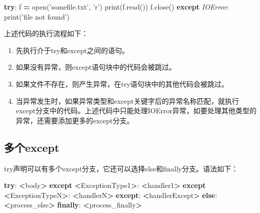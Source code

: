 \documentclass[]{ctexbook}
\newenvironment{Shaded}{\begin{snugshade}}{\end{snugshade}}
\newcommand{\BuiltInTok}[1]{#1}
\newcommand{\ControlFlowTok}[1]{\textcolor[rgb]{0.13,0.29,0.53}{\textbf{#1}}}
\newcommand{\NormalTok}[1]{#1}
\newcommand{\OperatorTok}[1]{\textcolor[rgb]{0.81,0.36,0.00}{\textbf{#1}}}
\newcommand{\PreprocessorTok}[1]{\textcolor[rgb]{0.56,0.35,0.01}{\textit{#1}}}
\newcommand{\StringTok}[1]{\textcolor[rgb]{0.31,0.60,0.02}{#1}}
\providecommand{\tightlist}{%
  \setlength{\itemsep}{0pt}\setlength{\parskip}{0pt}}
\begin{document}
\begin{Shaded}
\begin{Highlighting}[]
\ControlFlowTok{try}\NormalTok{:}
\NormalTok{    f }\OperatorTok{=} \BuiltInTok{open}\NormalTok{(}\StringTok{'somefile.txt'}\NormalTok{, }\StringTok{'r'}\NormalTok{)}
    \BuiltInTok{print}\NormalTok{(f.read())}
\NormalTok{    f.close()}
\ControlFlowTok{except} \PreprocessorTok{IOError}\NormalTok{:}
    \BuiltInTok{print}\NormalTok{(}\StringTok{'file not found'}\NormalTok{)}
\end{Highlighting}
\end{Shaded}

上述代码的执行流程如下：

\begin{enumerate}
\def\labelenumi{\arabic{enumi}.}
\setcounter{enumi}{26}
\tightlist
\item
  先执行介于try和except之间的语句。
\item
  如果没有异常，则except语句块中的代码会被跳过。
\item
  如果文件不存在，则产生异常，在try语句块中的其他代码会被跳过。
\item
  当异常发生时，如果异常类型和except关键字后的异常名称匹配，就执行except分支中的代码。上述代码中只能处理IOError异常，如要处理其他类型的异常，还需要添加更多的except分支。
\end{enumerate}

\hypertarget{ux591aux4e2aexcept}{%
\subsection{多个except}\label{ux591aux4e2aexcept}}

try声明可以有多个except分支，它还可以选择else和finally分支。语法如下：

\begin{Shaded}
\begin{Highlighting}[]
\ControlFlowTok{try}\NormalTok{:}
    \OperatorTok{<}\NormalTok{body}\OperatorTok{>}
\ControlFlowTok{except} \OperatorTok{<}\NormalTok{ExceptionType1}\OperatorTok{>}\NormalTok{:}
    \OperatorTok{<}\NormalTok{handler1}\OperatorTok{>}
\ControlFlowTok{except} \OperatorTok{<}\NormalTok{ExceptionTypeN}\OperatorTok{>}\NormalTok{:}
    \OperatorTok{<}\NormalTok{handlerN}\OperatorTok{>}
\ControlFlowTok{except}\NormalTok{:}
    \OperatorTok{<}\NormalTok{handlerExcept}\OperatorTok{>}
\ControlFlowTok{else}\NormalTok{:}
    \OperatorTok{<}\NormalTok{process_else}\OperatorTok{>}
\ControlFlowTok{finally}\NormalTok{:}
    \OperatorTok{<}\NormalTok{process_finally}\OperatorTok{>}
\end{Highlighting}
\end{Shaded}
\end{document}
